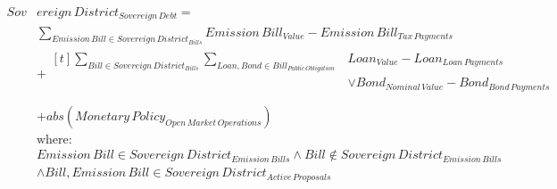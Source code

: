 \documentclass[fleqn]{article}
\begin{document}
	\begin{equation}
	\begin{split}
		Sov&ereign \, District_{Sovereign \, Debt} = \\
		&\displaystyle\sum_{Emission \, Bill \in Sovereign \, District_{Bills}} Emission \, Bill_{Value} - Emission \, Bill_{Tax \, Payments} \\
		& + \begin{aligned}[t] \displaystyle\sum_{Bill \in Sovereign \, District_{Bills}} 
		\displaystyle\sum_{Loan, Bond \in Bill_{Public \, Obligation}} 
			&Loan_{Value} - Loan_{Loan \, Payments} \\
			&\lor Bond_{Nominal \, Value} - Bond_{Bond \, Payments} \\
		\end{aligned}  \\
		& + abs(Monetary \, Policy_{Open \, Market \, Operations}) \\
		& \text{where:} \\
		& Emission \, Bill \in Sovereign \, District_{Emission \, Bills} \land Bill \not\in Sovereign \, District_{Emission \, Bills} \\
		& \land Bill, Emission \, Bill \in Sovereign \, District_{Active \, Proposals}
	\end{split}
	\end{equation}
\end{document}
